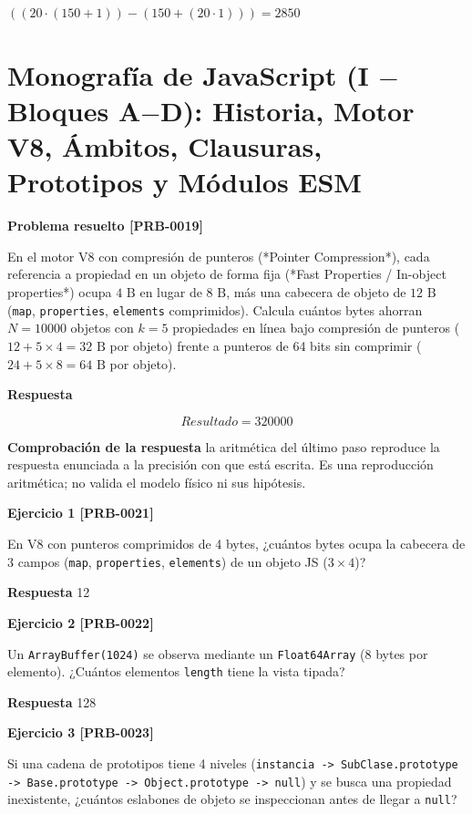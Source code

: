 \documentclass{book}
\begin{document}
\(\left(\left(20\cdot \left(150+1\right)\right)-\left(150+\left(20\cdot 1\right)\right)\right) = 2850\)

\section{Monografía de JavaScript (I \(-\) Bloques A\(-\)D): Historia, Motor V8, Ámbitos, Clausuras, Prototipos y Módulos ESM}

\noindent\textbf{Problema resuelto [PRB-0019]}

En el motor V8 con compresión de punteros (*Pointer Compression*), cada referencia a propiedad en un objeto de forma fija (*Fast Properties / In-object properties*) ocupa \(4\text{ B}\) en lugar de \(8\text{ B}\), más una cabecera de objeto de \(12\text{ B}\) (\texttt{map}, \texttt{properties}, \texttt{elements} comprimidos). Calcula cuántos bytes ahorran \(N = 10000\) objetos con \(k = 5\) propiedades en línea bajo compresión de punteros (\(12 + 5 \times 4 = 32\text{ B}\) por objeto) frente a punteros de 64 bits sin comprimir (\(24 + 5 \times 8 = 64\text{ B}\) por objeto).

\noindent\textbf{Respuesta}

\[
Resultado = 320000
\]

\noindent\textbf{Comprobación de la respuesta} la aritmética del último paso reproduce la respuesta enunciada a la precisión con que está escrita. Es una reproducción aritmética; no valida el modelo físico ni sus hipótesis.

\noindent\textbf{Ejercicio 1 [PRB-0021]}

En V8 con punteros comprimidos de 4 bytes, ¿cuántos bytes ocupa la cabecera de 3 campos (\texttt{map}, \texttt{properties}, \texttt{elements}) de un objeto JS (\(3 \times 4\))?

\noindent\textbf{Respuesta} 12

\noindent\textbf{Ejercicio 2 [PRB-0022]}

Un \texttt{ArrayBuffer(1024)} se observa mediante un \texttt{Float64Array} (8 bytes por elemento). ¿Cuántos elementos \texttt{length} tiene la vista tipada?

\noindent\textbf{Respuesta} 128

\noindent\textbf{Ejercicio 3 [PRB-0023]}

Si una cadena de prototipos tiene 4 niveles (\texttt{instancia -> SubClase.prototype -> Base.prototype -> Object.prototype -> null}) y se busca una propiedad inexistente, ¿cuántos eslabones de objeto se inspeccionan antes de llegar a \texttt{null}?
\end{document}
